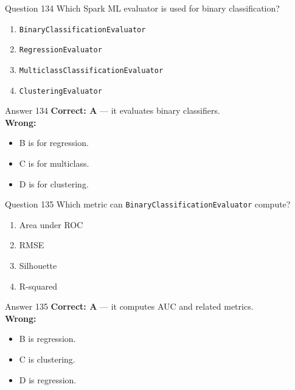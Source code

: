 \documentclass[aspectratio=169,11pt]{beamer}
\begin{document}
	\begin{frame}{Question 134}
		Which Spark ML evaluator is used for binary classification?
		\begin{enumerate}[label=\Alph*.]
			\item \texttt{BinaryClassificationEvaluator}
			\item \texttt{RegressionEvaluator}
			\item \texttt{MulticlassClassificationEvaluator}
			\item \texttt{ClusteringEvaluator}
		\end{enumerate}
	\end{frame}
	\begin{frame}{Answer 134}
		\textbf{Correct: A} --- it evaluates binary classifiers.\\
		\vspace{0.5em}
		\textbf{Wrong:}
		\begin{itemize}
			\item B is for regression.
			\item C is for multiclass.
			\item D is for clustering.
		\end{itemize}
	\end{frame}
	
	\begin{frame}{Question 135}
		Which metric can \texttt{BinaryClassificationEvaluator} compute?
		\begin{enumerate}[label=\Alph*.]
			\item Area under ROC
			\item RMSE
			\item Silhouette
			\item R-squared
		\end{enumerate}
	\end{frame}
	\begin{frame}{Answer 135}
		\textbf{Correct: A} --- it computes AUC and related metrics.\\
		\vspace{0.5em}
		\textbf{Wrong:}
		\begin{itemize}
			\item B is regression.
			\item C is clustering.
			\item D is regression.
		\end{itemize}
	\end{frame}
	
\end{document}
